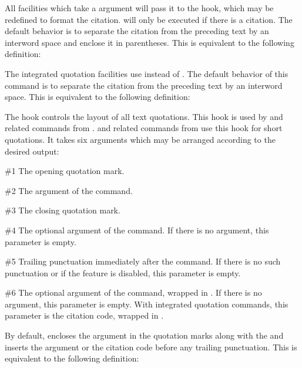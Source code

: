\documentclass{ltxdockit}[2010/09/26]
\begin{document}
\begin{ltxsyntax}


All facilities which take a  argument will pass it to the  hook, which may be redefined to format the citation.  will only be executed if there is a citation. The default behavior is to separate the citation from the preceding text by an interword space and enclose it in parentheses. This is equivalent to the following definition:

\begin{ltxcode}[showspaces=true]
\newcommand*{<<\mkcitation>>}[1]{ (#1)}
\end{ltxcode}


The integrated quotation facilities use  instead of . The default behavior of this command is to separate the citation from the preceding text by an interword space. This is equivalent to the following definition:

\begin{ltxcode}[showspaces=true]
\newcommand*{<<\mkccitation>>}[1]{ #1}
\end{ltxcode}


The  hook controls the layout of all text quotations. This hook is used by  and related commands from .  and related commands from  use this hook for short quotations. It takes six arguments which may be arranged according to the desired output:

\begin{argumentlist}{00}
\item[\#1] The opening quotation mark.
\item[\#2] The  argument of the command.
\item[\#3] The closing quotation mark.
\item[\#4] The optional  argument of the command. If there is no  argument, this parameter is empty.
\item[\#5] Trailing  punctuation immediately after the command. If there is no such punctuation or if the  feature is disabled, this parameter is empty.
\item[\#6] The optional  argument of the command, wrapped in . If there is no  argument, this parameter is empty. With integrated quotation commands, this parameter is the citation code, wrapped in .
\end{argumentlist}
%
By default,  encloses the  argument in the quotation marks along with the  and inserts the  argument or the citation code before any trailing  punctuation. This is equivalent to the following definition:


\end{ltxsyntax}
\end{document}
